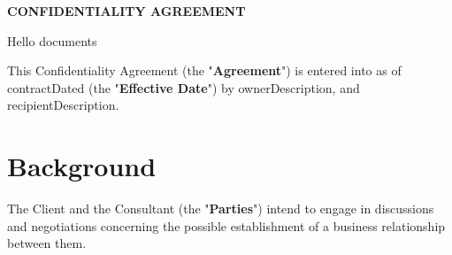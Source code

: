 \documentclass[12pt]{article}
\newcommand{\VAR}[1]{{\color{blue}#1}}
\begin{document}
\begin{center}
{\scshape\Large \par}
\vspace{1cm}
{\huge\bfseries CONFIDENTIALITY AGREEMENT \par}
\vspace{1cm}
\end{center}

Hello documents

This Confidentiality Agreement (the "{\bf Agreement}") is entered into as of  \VAR{contractDated}  (the  "{\bf Effective Date}") by  \VAR{ownerDescription}, and  \VAR{recipientDescription}.

\section{Background}

The Client and the Consultant (the "{\bf Parties}") intend to engage in discussions and negotiations concerning the possible establishment of a business relationship between them.
\end{document}
